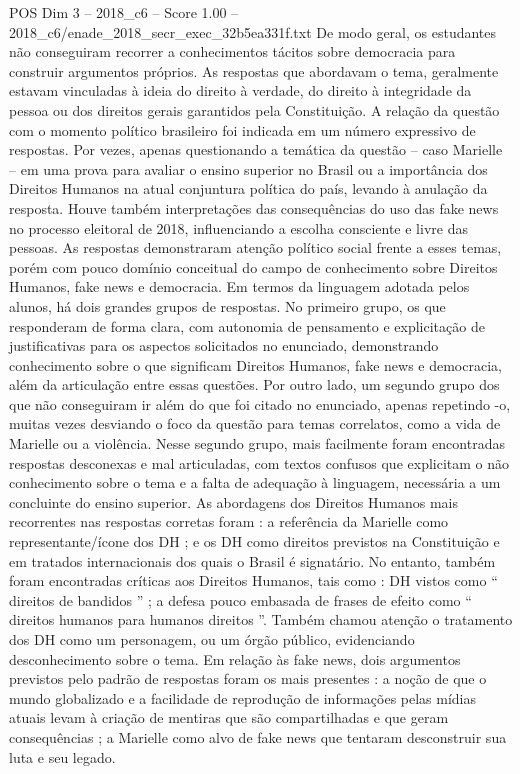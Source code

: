 \begin{textsample}{POS Dim 3 – 2018\_c6 – Score 1.00 – 2018\_c6/enade\_2018\_secr\_exec\_32b5ea331f.txt}
De modo geral, os estudantes não conseguiram recorrer a conhecimentos tácitos sobre democracia para construir argumentos próprios.
As respostas que abordavam o tema, geralmente estavam vinculadas à ideia do direito à verdade, do direito à integridade da pessoa ou dos direitos gerais garantidos pela Constituição.
A relação da questão com o momento político brasileiro foi indicada em um número expressivo de respostas.
Por vezes, apenas questionando a temática da questão – caso Marielle – em uma prova para avaliar o ensino superior no Brasil ou a importância dos Direitos Humanos na atual conjuntura política do país, levando à anulação da resposta.
Houve também interpretações das consequências do uso das fake news no processo eleitoral de 2018, influenciando a escolha consciente e livre das pessoas.
As respostas demonstraram atenção político social frente a esses temas, porém com pouco domínio conceitual do campo de conhecimento sobre Direitos Humanos, fake news e democracia.
Em termos da linguagem adotada pelos alunos, há dois grandes grupos de respostas.
No primeiro grupo, os que responderam de forma clara, com autonomia de pensamento e explicitação de justificativas para os aspectos solicitados no enunciado, demonstrando conhecimento sobre o que significam Direitos Humanos, fake news e democracia, além da articulação entre essas questões.
Por outro lado, um segundo grupo dos que não conseguiram ir além do que foi citado no enunciado, apenas repetindo -o, muitas vezes desviando o foco da questão para temas correlatos, como a vida de Marielle ou a violência.
Nesse segundo grupo, mais facilmente foram encontradas respostas desconexas e mal articuladas, com textos confusos que explicitam o não conhecimento sobre o tema e a falta de adequação à linguagem, necessária a um concluinte do ensino superior.
As abordagens dos Direitos Humanos mais recorrentes nas respostas corretas foram : a referência da Marielle como representante/ícone dos DH ; e os DH como direitos previstos na Constituição e em tratados internacionais dos quais o Brasil é signatário.
No entanto, também foram encontradas críticas aos Direitos Humanos, tais como : DH vistos como “ direitos de bandidos ” ; a defesa pouco embasada de frases de efeito como “ direitos humanos para humanos direitos ”.
Também chamou atenção o tratamento dos DH como um personagem, ou um órgão público, evidenciando desconhecimento sobre o tema.
Em relação às fake news, dois argumentos previstos pelo padrão de respostas foram os mais presentes : a noção de que o mundo globalizado e a facilidade de reprodução de informações pelas mídias atuais levam à criação de mentiras que são compartilhadas e que geram consequências ; a Marielle como alvo de fake news que tentaram desconstruir sua luta e seu legado.

\end{textsample}
